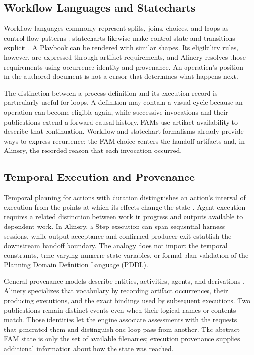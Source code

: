\documentclass[letterpaper]{article}
\theoremstyle{definition}
\begin{document}
\subsection{Workflow Languages and Statecharts}

Workflow languages commonly represent splits, joins, choices, and loops as
control-flow patterns \cite{vanderAalst2003workflow}; statecharts likewise make
control state and transitions explicit \cite{harel1987statecharts}. A Playbook
can be rendered with similar shapes. Its eligibility rules, however, are
expressed through artifact requirements, and Alinery resolves those
requirements using occurrence identity and provenance. An operation's position
in the authored document is not a cursor that determines what happens next.

The distinction between a process definition and its execution record is
particularly useful for loops. A definition may contain a visual cycle because
an operation can become eligible again, while successive invocations and their
publications extend a forward causal history. FAMs use artifact availability
to describe that continuation. Workflow and statechart formalisms already
provide ways to express recurrence; the FAM choice centers the handoff
artifacts and, in Alinery, the recorded reason that each invocation occurred.

\subsection{Temporal Execution and Provenance}

Temporal planning for actions with duration distinguishes an action's interval
of execution from the points at which its effects change the state
\cite{fox2003pddl21}. Agent execution requires a related distinction between
work in progress and outputs available to dependent work. In Alinery, a Step
execution can span sequential harness sessions, while output acceptance and
confirmed producer exit establish the downstream handoff boundary. The
analogy does not import the temporal constraints, time-varying numeric state
variables, or formal plan validation of the Planning Domain Definition
Language (PDDL).

General provenance models describe entities, activities, agents, and
derivations \cite{moreau2013prov}. Alinery specializes that vocabulary by
recording artifact occurrences, their producing executions, and the exact
bindings used by subsequent executions. Two publications remain distinct
events even when their logical names or contents match. Those identities let
the engine associate assessments with the requests that generated them and
distinguish one loop pass from another. The abstract FAM state is only the set
of available filenames; execution provenance supplies additional information
about how the state was reached.
\end{document}
